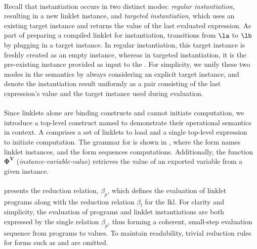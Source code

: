		\paragraph{}%
			Recall that instantiation occurs in two distinct modes: \emph{regular instantiation}, resulting in a new linklet instance, and \emph{targeted instantiation}, which uses an existing target instance and returns the value of the last evaluated expression. As part of preparing a compiled linklet for instantiation,  transitions from $\la$ to $\lb$ by plugging in a target instance. In regular instantiation, this target instance is freshly created as an empty instance, whereas in targeted instantiation, it is the pre-existing instance provided as input to the . For simplicity, we unify these two modes in the semantics by always considering an explicit target instance, and denote the instantiation result uniformly as a pair consisting of the last expression's value and the target instance used during evaluation.


		\paragraph{}%
			Since linklets alone are binding constructs and cannot initiate computation, we introduce a top-level construct named  to demonstrate their operational semantics in context. A  comprises a set of linklets to load and a single top-level expression to initiate computation. The grammar for  is shown in , where the  form names linklet instances, and the  form sequences computations. Additionally, the function $\bm{\Phi^V}$ (\emph{instance-variable-value}) retrieves the value of an exported variable from a given instance.


		\paragraph{}%
			 presents the reduction relation, $\beta_p$, which defines the evaluation of linklet programs along with the reduction relation $\beta_l$ for the \gls{lkl}. For clarity and simplicity, the evaluation of programs and linklet instantiations are both expressed by the single relation $\beta_p$, thus forming a coherent, small-step evaluation sequence from programs to values. To maintain readability, trivial reduction rules for forms such as  and  are omitted.

